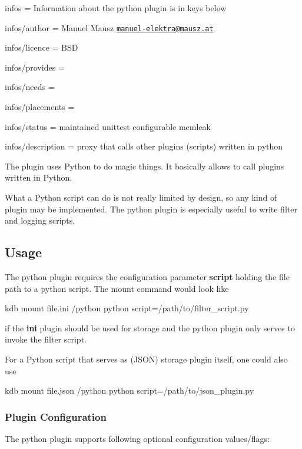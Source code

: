
\begin{DoxyItemize}
\item infos = Information about the python plugin is in keys below
\item infos/author = Manuel Mausz \href{mailto:manuel-elektra@mausz.at}{\tt manuel-\/elektra@mausz.\+at}
\item infos/licence = B\+SD
\item infos/provides =
\item infos/needs =
\item infos/placements =
\item infos/status = maintained unittest configurable memleak
\item infos/description = proxy that calls other plugins (scripts) written in python
\end{DoxyItemize}

The plugin uses Python to do magic things. It basically allows to call plugins written in Python.

What a Python script can do is not really limited by design, so any kind of plugin may be implemented. The python plugin is especially useful to write filter and logging scripts.

\subsection*{Usage}

The python plugin requires the configuration parameter {\bfseries script} holding the file path to a python script. The mount command would look like \begin{DoxyVerb}kdb mount file.ini /python python script=/path/to/filter_script.py
\end{DoxyVerb}


if the {\bfseries ini} plugin should be used for storage and the python plugin only serves to invoke the filter script.

For a Python script that serves as (J\+S\+ON) storage plugin itself, one could also use \begin{DoxyVerb}kdb mount file.json /python python script=/path/to/json_plugin.py
\end{DoxyVerb}


\subsubsection*{Plugin Configuration}

The python plugin supports following optional configuration values/flags\+:


